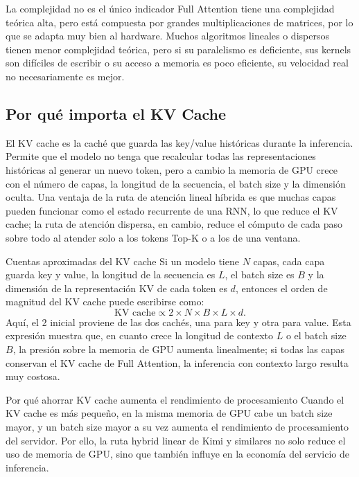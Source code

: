 \begin{warningbox}{La complejidad no es el único indicador}
Full Attention tiene una complejidad teórica alta, pero está compuesta por grandes multiplicaciones de matrices, por lo que se adapta muy bien al hardware. Muchos algoritmos lineales o dispersos tienen menor complejidad teórica, pero si su paralelismo es deficiente, sus kernels son difíciles de escribir o su acceso a memoria es poco eficiente, su velocidad real no necesariamente es mejor.
\end{warningbox}

\subsection{Por qué importa el KV Cache}

El KV cache es la caché que guarda las key/value históricas durante la inferencia. Permite que el modelo no tenga que recalcular todas las representaciones históricas al generar un nuevo token, pero a cambio la memoria de GPU crece con el número de capas, la longitud de la secuencia, el batch size y la dimensión oculta. Una ventaja de la ruta de atención lineal híbrida es que muchas capas pueden funcionar como el estado recurrente de una RNN, lo que reduce el KV cache; la ruta de atención dispersa, en cambio, reduce el cómputo de cada paso sobre todo al atender solo a los tokens Top-K o a los de una ventana.

\begin{knowledgebox}{Cuentas aproximadas del KV cache}
Si un modelo tiene \(N\) capas, cada capa guarda key y value, la longitud de la secuencia es \(L\), el batch size es \(B\) y la dimensión de la representación KV de cada token es \(d\), entonces el orden de magnitud del KV cache puede escribirse como:
\[
\text{KV cache} \propto 2 \times N \times B \times L \times d.
\]
Aquí, el 2 inicial proviene de las dos cachés, una para key y otra para value. Esta expresión muestra que, en cuanto crece la longitud de contexto \(L\) o el batch size \(B\), la presión sobre la memoria de GPU aumenta linealmente; si todas las capas conservan el KV cache de Full Attention, la inferencia con contexto largo resulta muy costosa.
\end{knowledgebox}

\begin{importantbox}{Por qué ahorrar KV cache aumenta el rendimiento de procesamiento}
Cuando el KV cache es más pequeño, en la misma memoria de GPU cabe un batch size mayor, y un batch size mayor a su vez aumenta el rendimiento de procesamiento del servidor. Por ello, la ruta hybrid linear de Kimi y similares no solo reduce el uso de memoria de GPU, sino que también influye en la economía del servicio de inferencia.
\end{importantbox}


